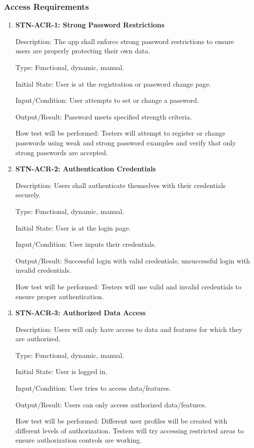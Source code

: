 \documentclass[12pt, titlepage]{article}
\begin{document}
\subsubsection{Access Requirements}

\begin{enumerate}

\item {\textbf{STN-ACR-1: Strong Password Restrictions}}

Description: The app shall enforce strong password restrictions to ensure users are properly protecting their own data.

Type: Functional, dynamic, manual.

Initial State: User is at the registration or password change page.

Input/Condition: User attempts to set or change a password.

Output/Result: Password meets specified strength criteria.

How test will be performed: Testers will attempt to register or change passwords using weak and strong password examples and verify that only strong passwords are accepted.


\item{\textbf{STN-ACR-2: Authentication Credentials}}

Description:  Users shall authenticate themselves with their credentials securely.

Type: Functional, dynamic, manual.

Initial State: User is at the login page.

Input/Condition: User inputs their credentials.

Output/Result: Successful login with valid credentials; unsuccessful login with invalid credentials.

How test will be performed: Testers will use valid and invalid credentials to ensure proper authentication.


\item{\textbf{STN-ACR-3: Authorized Data Access}}

Description: Users will only have access to data and features for which they are authorized.

Type: Functional, dynamic, manual.

Initial State: User is logged in.

Input/Condition: User tries to access data/features.

Output/Result: Users can only access authorized data/features.

How test will be performed: Different user profiles will be created with different levels of authorization. Testers will try accessing restricted areas to ensure authorization controls are working.

\end{enumerate}
\end{document}

